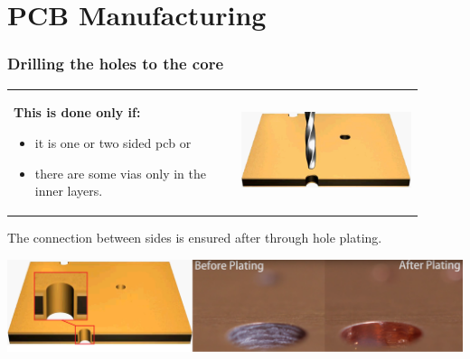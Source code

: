 \documentclass{beamer}
\begin{document}
\section{\texorpdfstring{PCB Manufacturing}{PCB Manufacturing}}
	\begin{frame}
    \frametitle{Drilling the holes to the core}

		\begin{center}
			\begin{tabular}{m{0.5\linewidth} m{0.4\linewidth}}
			\textbf{This is done only if:}
			\begin{itemize}
				\item it is one or two sided pcb or
				\item there are some vias only in the inner layers.
			\end{itemize}
			 & \includegraphics[scale=0.12]{obr03_jadroVrtani.png}
			\end{tabular}
		\end{center}
		The connection between sides is ensured after through hole plating.
		\begin{center}
		\includegraphics[scale=0.12]{obr04_jadroProkovy.png}
		\end{center}
	\end{frame}
\end{document}
